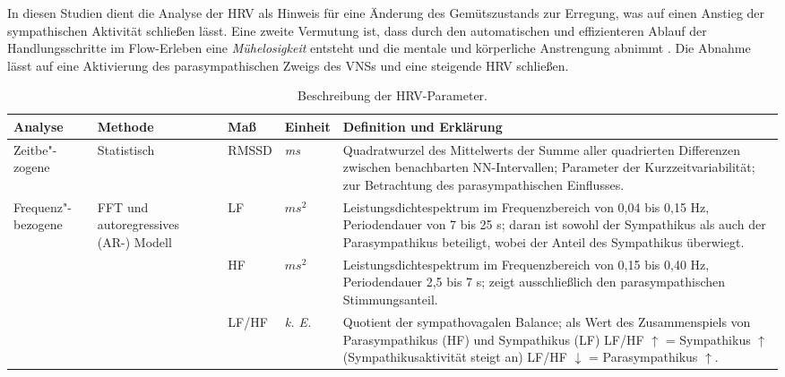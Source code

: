 In diesen Studien dient die Analyse der \ac{HRV} als Hinweis für eine Änderung des Gemütszustands zur Erregung, was auf einen Anstieg der sympathischen Aktivität schließen lässt. Eine zweite Vermutung ist, dass durch den automatischen und effizienteren Ablauf der Handlungsschritte im Flow-Erleben eine \emph{Mühelosigkeit} entsteht und die mentale und körperliche Anstrengung abnimmt \citep[][S.~308]{deManzano2010}. Die Abnahme lässt auf eine Aktivierung des parasympathischen Zweigs des \acs{VNS}s und eine steigende \ac{HRV} schließen. 
\begin{table}
	[!htb] \caption[Beschreibung der \acs{HRV}-Parameter]{Beschreibung der \acs{HRV}-Parameter.} \label{tab:beschreibung_der_hrv_parameter} 
	\begin{tabularx}
		{ 
		\textwidth}{p{} p{} p{} p{} X} \toprule Analyse & Methode & Maß & Einheit & Definition und Erklärung \\
		\midrule Zeitbe"-zogene & Statistisch & \acs{RMSSD} & \emph{ms} & Quadratwurzel des Mittelwerts der Summe aller quadrierten Differenzen zwischen benachbarten NN-Intervallen; Parameter der Kurzzeitvariabilität; zur Betrachtung des parasympathischen Einflusses. \\
		\hline
		
		Frequenz"-bezogene & \acs{FFT} und autoregressives (AR-) Modell & \acs{LF} & $ms^{2}$ & Leistungsdichtespektrum im Frequenzbereich von 0,04 bis 0,15 Hz, Periodendauer von 7 bis 25 s; daran ist sowohl der Sympathikus als auch der Parasympathikus beteiligt, wobei der Anteil des Sympathikus überwiegt. \\
		\cline{3-5}
		
		& & \acs{HF} & $ms^{2}$ & Leistungsdichtespektrum im Frequenzbereich von 0,15 bis 0,40 Hz, Periodendauer 2,5 bis 7 s; zeigt ausschließlich den parasympathischen Stimmungsanteil. \\
		\cline{3-5}
		
		& & \acs{LF}/\acs{HF} & \emph{k. E.} & Quotient der sympathovagalen Balance; als Wert des Zusammenspiels von Parasympathikus (\acs{HF}) und Sympathikus (\acs{LF}) \acs{LF}/\acs{HF} $\uparrow{}$ = Sympathikus $\uparrow{}$ (Sympathikusaktivität steigt an) \acs{LF}/\acs{HF} $\downarrow{}$ = Parasympathikus $\uparrow{}$. \\
		\bottomrule 
	\end{tabularx}
\end{table}

\paragraph{\citet{deManzano2010}} 


